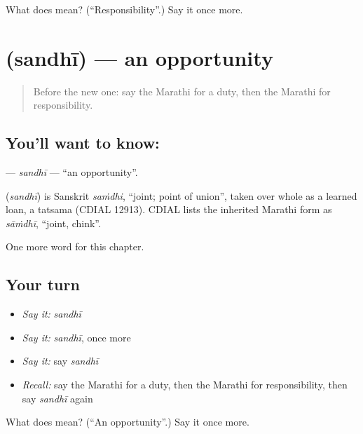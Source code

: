 \begin{tcolorbox}[breakable,colback=teal!4,colframe=teal!35!black,title={Before you move on}]
What does  mean? (\textquotedblleft{}Responsibility\textquotedblright{}.) Say it once more.
\end{tcolorbox}
\section[\texorpdfstring{\mr{संधी} (sandhī)}{संधी (sandhī)}]{ (sandhī) — an opportunity}

\label{lesson:MR-C272-sandhi}



\begin{quote}
Before the new one: say the Marathi for a duty, then the Marathi for responsibility.
\end{quote}

\subsection*{You'll want to know: }
\textbf{} — \emph{sandhī} — \textquotedblleft{}an opportunity\textquotedblright{}.

\begin{cousinweb}
\textbf{} (\emph{sandhī}) is Sanskrit \emph{saṁdhi}, \textquotedblleft{}joint; point of union\textquotedblright{}, taken over whole as a learned loan, a tatsama (CDIAL 12913). CDIAL lists the inherited Marathi form as \emph{sāṁdhī}, \textquotedblleft{}joint, chink\textquotedblright{}.
\end{cousinweb}

\begin{grammarlens}[title={What you've built}]
One more word for this chapter.
\end{grammarlens}

\subsection*{Your turn}
\begin{itemize}
\raggedright
  \item \emph{Say it:} \emph{sandhī}
  \item \emph{Say it:} \emph{sandhī}, once more
  \item \emph{Say it:} say \emph{sandhī}
  \item \emph{Recall:} say the Marathi for a duty, then the Marathi for responsibility, then say \emph{sandhī} again
\end{itemize}

\begin{tcolorbox}[breakable,colback=teal!4,colframe=teal!35!black,title={Before you move on}]
What does  mean? (\textquotedblleft{}An opportunity\textquotedblright{}.) Say it once more.
\end{tcolorbox}
